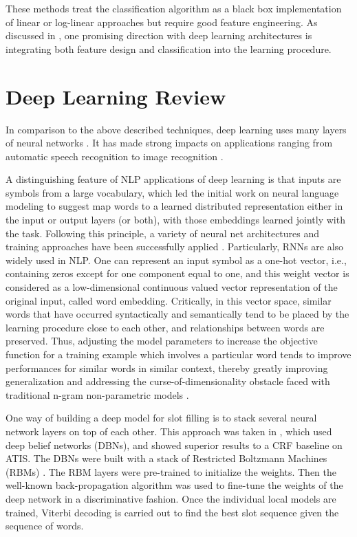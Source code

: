 These methods treat the classification algorithm as a black box implementation
of linear or log-linear approaches but require good feature engineering. As
discussed in \citep{rnn57,rnn13}, one promising direction with deep learning architectures
is integrating both feature design and classification into the learning
procedure.

\section{Deep Learning Review}
\label{sec:deepreview}

In comparison to the above described techniques, deep learning uses many layers
of neural networks \citep{rnn57}. It has made strong impacts on applications ranging
from automatic speech recognition \citep{rnn8} to image recognition \citep{rnn10}. 

A distinguishing feature of NLP applications of deep learning is that inputs
are symbols from a large vocabulary, which led the initial work on neural
language modeling \citep{rnn26} to suggest map words to a learned distributed
representation either in the input or output layers (or both), with those
embeddings learned jointly with the task. Following this principle, a variety
of neural net architectures and training approaches have been successfully
applied \citep{rnn11,rnn13,rnn20,rnn22,rnn23,rnn39,rnn49,rnn58,rnn59,rnn60,rnn61}. Particularly, RNNs \citep{rnn22,rnn23,rnn49} are
also widely used in NLP. One can represent an input symbol as a one-hot vector,
i.e., containing zeros except for one component equal to one, and this weight
vector is considered as a low-dimensional continuous valued vector
representation of the original input, called word embedding. Critically, in
this vector space, similar words that have occurred syntactically and
semantically tend to be placed by the learning procedure close to each other,
and relationships between words are preserved. Thus, adjusting the model
parameters to increase the objective function for a training example which
involves a particular word tends to improve performances for similar words in
similar context, thereby greatly improving generalization and addressing the
curse-of-dimensionality obstacle faced with traditional n-gram non-parametric
models \citep{rnn26}.

One way of building a deep model for slot filling is to stack several neural
network layers on top of each other. This approach was taken in \citep{rnn27}, which
used deep belief networks (DBNs), and showed superior results to a CRF baseline
on ATIS. The DBNs were built with a stack of Restricted Boltzmann Machines
(RBMs) \citep{rnn12}. The RBM layers were pre-trained to initialize the weights. Then
the well-known back-propagation algorithm was used to fine-tune the weights of
the deep network in a discriminative fashion. Once the individual local models
are trained, Viterbi decoding is carried out to find the best slot sequence
given the sequence of words. 

